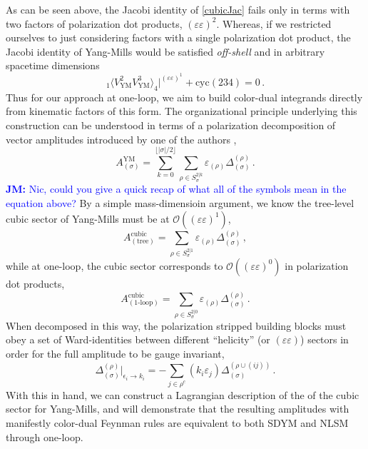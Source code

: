 \documentclass[11pt,letter]{article}
\newcommand{\jm}[1]{\textcolor{blue}{\textbf{JM: }{#1}}}
\begin{document}
As can be seen above, the Jacobi identity of \cref{cubicJac} fails
only in terms with two factors of polarization dot products,
$(\varepsilon\varepsilon)^2$. Whereas, if we restricted ourselves to
just considering factors with a single polarization dot product, the
Jacobi identity of Yang-Mills would be satisfied \textit{off-shell}
and in arbitrary spacetime dimensions
\begin{equation}
{}_1\langle V^{2}_{\text{YM}}V^{3}_{\text{YM}}\rangle_4\big|^{(\varepsilon\varepsilon)^1}+\text{cyc}(234) =0\,.
\end{equation}
Thus for our approach at one-loop, we aim to build color-dual
integrands directly from kinematic factors of this form. The
organizational principle underlying this construction can be
understood in terms of a polarization decomposition of vector
amplitudes introduced by one of the authors \cite{Pavao:2022kog},
\begin{equation}\label{eq:pureVecRABD}
A_{(\sigma)}^{\text{YM}} = \sum_{k=0}^{\lfloor |\sigma|/2\rfloor}\sum_{\rho \in S^{2|k}_{\sigma}}\varepsilon_{(\rho)} \Delta_{(\sigma)}^{(\rho)}\,.
\end{equation}
\jm{Nic, could you give a quick recap of what all of the symbols mean
  in the equation above?}  By a simple mass-dimensioin argument, we
know the tree-level cubic sector of Yang-Mills must be at
$\mathcal{O}((\varepsilon\varepsilon)^1)$,
\begin{equation}
A_{(\text{tree})}^{\text{cubic}} = \sum_{\rho \in S^{2|1}_{\sigma}}\varepsilon_{(\rho)} \Delta_{(\sigma)}^{(\rho)}\, ,
\end{equation}
while at one-loop, the cubic sector corresponds to
$\mathcal{O}((\varepsilon\varepsilon)^0)$ in polarization dot
products,
\begin{equation}
A_{(\text{1-loop})}^{\text{cubic}} = \sum_{\rho \in S^{2|0}_{\sigma}}\varepsilon_{(\rho)} \Delta_{(\sigma)}^{(\rho)}\,.
\end{equation}
When decomposed in this way, the polarization stripped building blocks
must obey a set of Ward-identities between different ``helicity'' (or
$(\varepsilon \varepsilon)$) sectors in order for the full amplitude
to be gauge invariant,
 \begin{equation}\label{eq:GIrelA}
\Delta_{(\sigma)}^{(\rho)}\Big|_{\epsilon_i\rightarrow k_i} =-
\sum_{j \in \rho^c} (k_i \varepsilon_j)\Delta_{(\sigma )}^{(\rho\cup (ij))} \,.
\end{equation}
With this in hand, we can construct a Lagrangian description of the of
the cubic sector for Yang-Mills, and will demonstrate that the
resulting amplitudes with manifestly color-dual Feynman rules are
equivalent to both SDYM and NLSM through one-loop.
\end{document}

